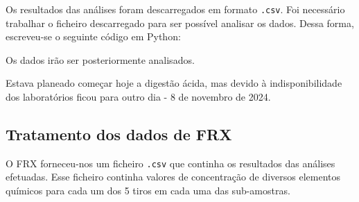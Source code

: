 Os resultados das análises foram descarregados em formato \texttt{.csv}.
Foi necessário trabalhar o ficheiro descarregado para ser possível analisar os dados.
Dessa forma, escreveu-se o seguinte código em Python:




Os dados irão ser posteriormente analisados.

\hrulefill



Estava planeado começar hoje a digestão ácida, mas devido à indisponibilidade dos laboratórios ficou para outro dia - 8 de novembro de 2024.

\hrulefill



\subsection*{Tratamento dos dados de FRX}\label{subsec:tratamento-dados-frx}

O FRX forneceu-nos um ficheiro \texttt{.csv} que continha os resultados das análises efetuadas.
Esse ficheiro continha valores de concentração de diversos elementos químicos para cada um dos 5 tiros em cada uma das sub-amostras.

